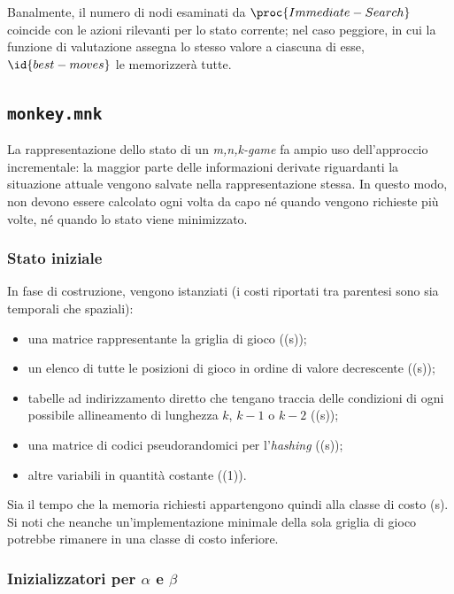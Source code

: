 \documentclass{article}
\begin{document}
Banalmente, il numero di nodi esaminati da $\proc{Immediate-Search}$ coincide
con le azioni rilevanti per lo stato corrente; nel caso peggiore, in cui la
funzione di valutazione assegna lo stesso valore a ciascuna di esse,
$\id{best-moves}$ le memorizzerà tutte.

\subsection{\texttt{monkey.mnk}}

La rappresentazione dello stato di un \emph{m,n,k-game} fa ampio uso
dell'approccio incrementale: la maggior parte delle informazioni derivate
riguardanti la situazione attuale vengono salvate nella rappresentazione stessa. In questo
modo, non devono essere calcolato ogni volta da capo né quando vengono
richieste più volte, né quando lo stato viene minimizzato.

\subsubsection{Stato iniziale}

In fase di costruzione, vengono istanziati (i costi riportati tra parentesi
sono sia temporali che spaziali):
\begin{itemize}
  \item una matrice rappresentante la griglia di gioco (\varTheta(s));
  \item un elenco di tutte le posizioni di gioco in ordine di valore decrescente (\varTheta(s));
  \item tabelle ad indirizzamento diretto che tengano traccia delle condizioni di ogni possibile allineamento di lunghezza $k$, $k - 1$ o $k - 2$ (\varTheta(s));
  \item una matrice di codici pseudorandomici per l'\emph{hashing} (\varTheta(s));
  \item altre variabili in quantità costante (\varTheta(1)).
\end{itemize}

Sia il tempo che la memoria richiesti appartengono quindi alla classe di costo
\varTheta(s). Si noti che neanche un'implementazione minimale della sola
griglia di gioco potrebbe rimanere in una classe di costo inferiore. 

\subsubsection{Inizializzatori per $\alpha$ e $\beta$}
\end{document}
